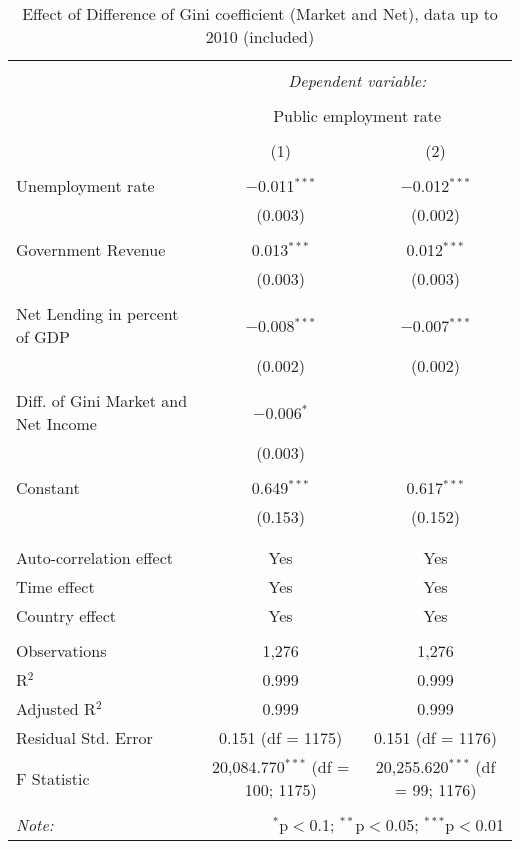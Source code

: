 
\begin{table}[!htbp] \centering 
  \caption{Effect of Difference of Gini coefficient (Market and Net), data up to 2010 (included)} 
  \label{} 
\begin{tabular}{@{\extracolsep{5pt}}lcc} 
\\[-1.8ex]\hline 
\hline \\[-1.8ex] 
 & \multicolumn{2}{c}{\textit{Dependent variable:}} \\ 
\cline{2-3} 
\\[-1.8ex] & \multicolumn{2}{c}{Public employment rate} \\ 
\\[-1.8ex] & (1) & (2)\\ 
\hline \\[-1.8ex] 
 Unemployment rate & $-$0.011$^{***}$ & $-$0.012$^{***}$ \\ 
  & (0.003) & (0.002) \\ 
  & & \\ 
 Government Revenue & 0.013$^{***}$ & 0.012$^{***}$ \\ 
  & (0.003) & (0.003) \\ 
  & & \\ 
 Net Lending in percent of GDP & $-$0.008$^{***}$ & $-$0.007$^{***}$ \\ 
  & (0.002) & (0.002) \\ 
  & & \\ 
 Diff. of Gini Market and Net Income & $-$0.006$^{*}$ &  \\ 
  & (0.003) &  \\ 
  & & \\ 
 Constant & 0.649$^{***}$ & 0.617$^{***}$ \\ 
  & (0.153) & (0.152) \\ 
  & & \\ 
\hline \\[-1.8ex] 
Auto-correlation effect & Yes & Yes \\ 
Time effect & Yes & Yes \\ 
Country effect & Yes & Yes \\ 
\hline \\[-1.8ex] 
Observations & 1,276 & 1,276 \\ 
R$^{2}$ & 0.999 & 0.999 \\ 
Adjusted R$^{2}$ & 0.999 & 0.999 \\ 
Residual Std. Error & 0.151 (df = 1175) & 0.151 (df = 1176) \\ 
F Statistic & 20,084.770$^{***}$ (df = 100; 1175) & 20,255.620$^{***}$ (df = 99; 1176) \\ 
\hline 
\hline \\[-1.8ex] 
\textit{Note:}  & \multicolumn{2}{r}{$^{*}$p$<$0.1; $^{**}$p$<$0.05; $^{***}$p$<$0.01} \\ 
\end{tabular} 
\end{table} 
